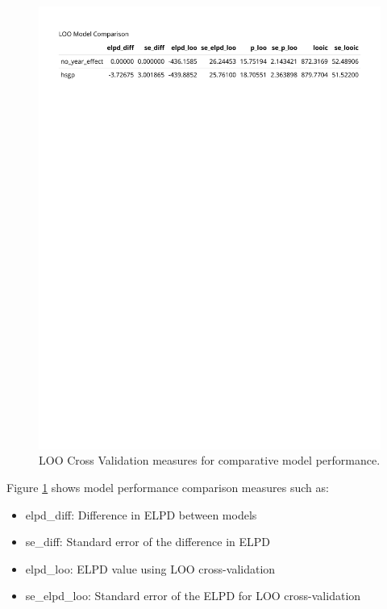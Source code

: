 \documentclass[
]{article}
\providecommand{\tightlist}{%
  \setlength{\itemsep}{0pt}\setlength{\parskip}{0pt}}
\begin{document}
\begin{figure}

{\centering \includegraphics[width=1\linewidth]{../outputs/bayesian-analysis-landfall-freq/best-model-comp} 

}

\caption{LOO Cross Validation measures for comparative model performance.}\label{fig:figs13}
\end{figure}

Figure \ref{fig:figs13} shows model performance comparison measures such as:

\begin{itemize}
\tightlist
\item
  elpd\_diff: Difference in ELPD between models
\item
  se\_diff: Standard error of the difference in ELPD
\item
  elpd\_loo: ELPD value using LOO cross-validation
\item
  se\_elpd\_loo: Standard error of the ELPD for LOO cross-validation
\end{itemize}
\end{document}
